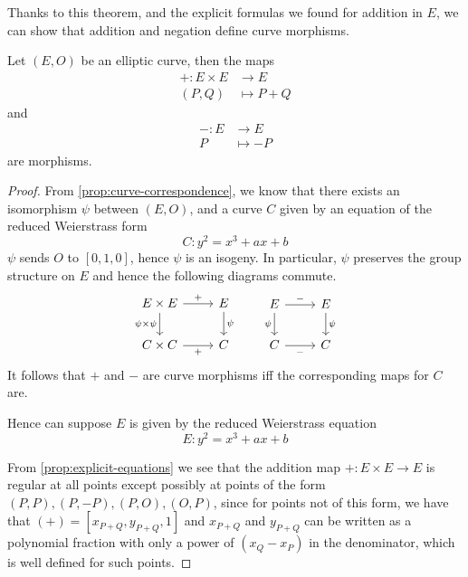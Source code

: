 
Thanks to this theorem, and the explicit formulas we found for addition
in $E$, we can show that addition and negation define curve morphisms.
\begin{theorem}
	\label{thm:group-morphism}
	Let $(E,O)$ be an elliptic curve, then the maps
	\begin{align*}
		+ : E\times E &\to E\\
		(P, Q) &\mapsto P + Q
	\end{align*}
	and
	\begin{align*}
		-: E &\to E\\
		P &\mapsto -P
	\end{align*}
	are morphisms.
\end{theorem}

\begin{proof}
	From \ref{prop:curve-correspondence}, we know that there exists an
	isomorphism $\psi$ between $(E, O)$, and a curve $C$ given by an equation
	of the reduced Weierstrass form
	\begin{equation*}
		C: y^2 = x^3 + ax + b
	\end{equation*}
	$\psi$ sends $O$ to $[0, 1, 0]$, hence $\psi$ is an isogeny.
	In particular, $\psi$ preserves the group structure on $E$ and hence
	the following diagrams commute.
	\begin{equation*}
		\begin{tikzcd}
			{E\times E} & {E} \\
			{C\times C} & {C}
			\arrow["{\psi\times\psi}"', from=1-1, to=2-1]
			\arrow["{+}"', from=2-1, to=2-2]
			\arrow["{+}", from=1-1, to=1-2]
			\arrow["{\psi}", from=1-2, to=2-2]
		\end{tikzcd}
		\qquad
		\begin{tikzcd}
			{E} & {E} \\
			{C} & {C}
			\arrow["\psi"', from=1-1, to=2-1]
			\arrow["{-}"', from=2-1, to=2-2]
			\arrow["{-}", from=1-1, to=1-2]
			\arrow["{\psi}", from=1-2, to=2-2]
		\end{tikzcd}	
	\end{equation*}
	It follows that $+$ and $-$ are curve morphisms iff the corresponding maps
	for $C$ are.

	Hence can suppose $E$ is given by
	the reduced Weierstrass equation
	\begin{equation*}
		E: y^2 = x^3 + ax + b
	\end{equation*}

	From \ref{prop:explicit-equations} we see that the addition map
	$+: E\times E\to E$ is regular at all points except possibly at points
	of the form $(P, P), (P, -P), (P, O), (O, P)$, since for points not of this
	form, we have that $(+) = [x_{P + Q}, y_{P + Q}, 1]$ and
	$x_{P + Q}$ and $y_{P + Q}$ can be written as a polynomial fraction
	with only a power of $(x_Q - x_P)$ in the denominator, which is well defined
	for such points.


\end{proof}
